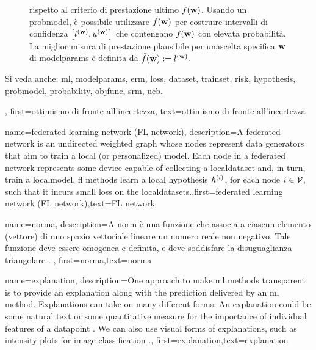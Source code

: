 {{\begin{figure}[H]
\begin{center}
{	rispetto al criterio di prestazione ultimo $\bar{f}({\bf w})$. Usando un \gls{probmodel}, è possibile utilizzare $f({\bf w})$  
	per costruire intervalli di confidenza  $\big[ l^{({\bf w})},  u^{({\bf w})} \big]$ che contengano $\bar{f}({\bf w})$  
	con elevata probabilità. La miglior misura di prestazione plausibile per unascelta specifica ${\bf w}$ di \glspl{modelparam} 
	è definita da $\tilde{f}({\bf w}) := l^{({\bf w})}$.} 
	\end{center}
		\end{figure}
		Si veda anche: \gls{ml}, \glspl{modelparam}, \gls{erm}, \gls{loss}, \gls{dataset}, \gls{trainset}, \gls{risk}, \gls{hypothesis}, \gls{probmodel}, \gls{probability}, \gls{objfunc}, \gls{srm}, \gls{ucb}.},
	first={ottimismo di fronte all’incertezza},
	text={ottimismo di fronte all’incertezza} 
}
{name={federated learning network (FL network)},
	description={A federated network is an undirected weighted \gls{graph} whose 
		nodes represent \gls{data} generators that aim to train a local (or personalized) \gls{model}. 
		Each node in a federated network represents some \gls{device} capable of collecting a \gls{localdataset} 
		and, in turn, train a \gls{localmodel}. 
	    \Gls{fl} methods learn a local \gls{hypothesis} $h^{(i)}$, for 
	    each node $i \in \mathcal{V}$, such that it incurs small \gls{loss} on the \gls{localdataset}s.},first={federated learning network (FL network)},text={FL network} 
}

{name={norma},
	description={A norm è una funzione che associa a ciascun elemento (vettore) 
	di uno spazio vettoriale lineare un numero reale non negativo. Tale funzione deve essere omogenea e definita, e deve soddisfare la disuguaglianza triangolare \cite{HornMatAnalysis}. },
	first={norma},text={norma} 
}

{name={explanation},
	description={One approach to make \gls{ml} methods transparent is to provide an 
		explanation along with the \gls{prediction} delivered by an 
		\gls{ml} method. Explanations can take on many different forms. An explanation 
		could be some natural text or some quantitative measure for the importance 
		of individual \gls{feature}s of a \gls{datapoint} \cite{Molnar2019}. We can also 
		use visual forms of explanations, such as intensity plots for image \gls{classification} \cite{GradCamPaper}.},
	first={explanation},text={explanation} 
}


